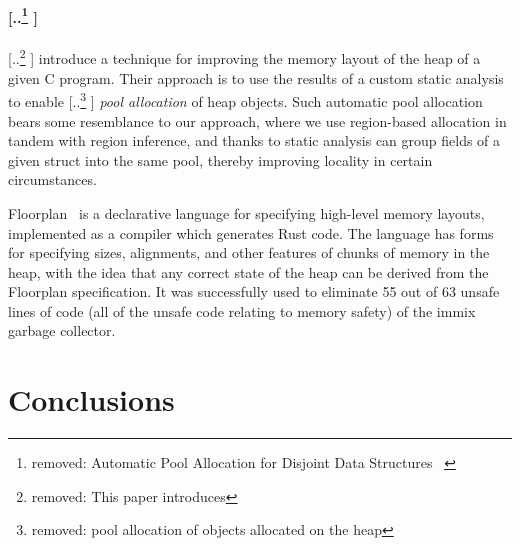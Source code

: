 \documentclass[acmsmall,review,anonymous]{acmart}\settopmatter{printfolios=true,printccs=false,printacmref=false}
\providecommand{\DIFaddtex}[1]{{\protect\color{blue} \sf #1}} %
\providecommand{\DIFdeltex}[1]{{\protect\color{red} [..\footnote{removed: #1} ]}} %
\providecommand{\DIFaddbegin}{} %
\providecommand{\DIFaddend}{} %
\providecommand{\DIFdelbegin}{} %
\providecommand{\DIFdelend}{} %
\providecommand{\DIFadd}[1]{\texorpdfstring{\DIFaddtex{#1}}{#1}} %
\providecommand{\DIFdel}[1]{\texorpdfstring{\DIFdeltex{#1}}{}} %
\newcommand{\DIFscaledelfig}{0.5}
\newlength{\DIFdelgraphicswidth} %
\newlength{\DIFdelgraphicsheight} %
\newcommand{\DIFaddincludegraphics}[2][]{{\color{blue}\fbox{\DIFOincludegraphics[#1]{#2}}}} %
\newcommand{\DIFdelincludegraphics}[2][]{%
\sbox{\DIFdelgraphicsbox}{\DIFOincludegraphics[#1]{#2}}%
\settoboxwidth{\DIFdelgraphicswidth}{\DIFdelgraphicsbox} %
\settoboxtotalheight{\DIFdelgraphicsheight}{\DIFdelgraphicsbox} %
\scalebox{\DIFscaledelfig}{%
\parbox[b]{\DIFdelgraphicswidth}{\usebox{\DIFdelgraphicsbox}\\[-\baselineskip] \rule{\DIFdelgraphicswidth}{0em}}\llap{\resizebox{\DIFdelgraphicswidth}{\DIFdelgraphicsheight}{%
\setlength{\unitlength}{\DIFdelgraphicswidth}%
\begin{picture}(1,1)%
\thicklines\linethickness{2pt} %
{\color[rgb]{1,0,0}\put(0,0){\framebox(1,1){}}}%
{\color[rgb]{1,0,0}\put(0,0){\line( 1,1){1}}}%
{\color[rgb]{1,0,0}\put(0,1){\line(1,-1){1}}}%
\end{picture}%
}\hspace*{3pt}}} %
} %
\DeclareRobustCommand{\DIFaddbegin}{\DIFOaddbegin \let\includegraphics\DIFaddincludegraphics} %
\DeclareRobustCommand{\DIFaddend}{\DIFOaddend \let\includegraphics\DIFOincludegraphics} %
\DeclareRobustCommand{\DIFdelbegin}{\DIFOdelbegin \let\includegraphics\DIFdelincludegraphics} %
\DeclareRobustCommand{\DIFdelend}{\DIFOaddend \let\includegraphics\DIFOincludegraphics} %
\begin{document}
\DIFdelbegin \paragraph{\DIFdel{Automatic Pool Allocation for Disjoint Data Structures ~\cite{poolallocation}}}
\addtocounter{paragraph}{-1}%

\DIFdel{This paper introduces }\DIFdelend \DIFaddbegin \DIFadd{\citet{poolallocation} introduce }\DIFaddend a technique for improving the memory layout of the heap of a given C program.
Their approach is to use the results of a custom static analysis to enable \DIFdelbegin \DIFdel{pool allocation of objects allocated on the heap }\DIFdelend \DIFaddbegin \DIFadd{\emph{pool allocation} of heap objects}\DIFaddend .
Such automatic pool allocation bears some resemblance to our approach, where we use region-based allocation in tandem with region inference, and thanks to static analysis can group fields of a given struct into the same pool, thereby
improving locality in certain circumstances.


\DIFaddbegin \DIFadd{Floorplan~\cite{Floorplan} is a declarative language for specifying high-level memory layouts, implemented as a compiler which generates Rust code. The language has forms for specifying sizes, alignments, and other features of chunks of memory in the heap, with the idea that any correct state of the heap can be derived from the Floorplan specification. It was successfully used to eliminate 55 out of 63 unsafe lines of code (all of the unsafe code relating to memory safety) of the immix garbage collector.
}































 \DIFaddend \section{Conclusions}
\end{document}
